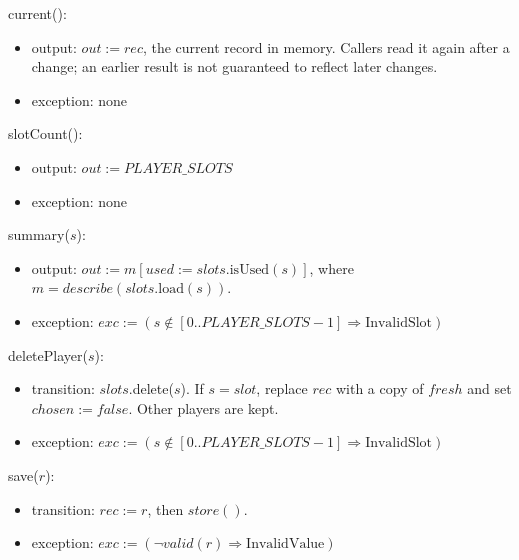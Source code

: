 \documentclass[10pt, titlepage]{article}
\newcommand{\T}[1]{\mathit{#1}}          %
\newcommand{\out}{\mathit{out}}
\newcommand{\exc}{\mathit{exc}}
\newcommand{\false}{\mathit{false}}
\begin{document}
\begin{samepage}
\noindent current():
\begin{itemize}
\item output: $\out := \T{rec}$, the current record in memory. Callers
  read it again after a change; an earlier result is not guaranteed to
  reflect later changes.
\item exception: none
\end{itemize}
\end{samepage}
\par\pagebreak[0]

\begin{samepage}
\noindent slotCount():
\begin{itemize}
\item output: $\out := \T{PLAYER\_SLOTS}$
\item exception: none
\end{itemize}
\end{samepage}
\par\pagebreak[0]

\begin{samepage}
\noindent summary($s$):
\begin{itemize}
\item output: $\out := m[\T{used} := \T{slots}.\text{isUsed}(s)]$, where
  $m = \T{describe}(\T{slots}.\text{load}(s))$.
\item exception: $\exc := (s \notin [0..\T{PLAYER\_SLOTS}-1]
  \Rightarrow \text{InvalidSlot})$
\end{itemize}
\end{samepage}
\par\pagebreak[0]

\begin{samepage}
\noindent deletePlayer($s$):
\begin{itemize}
\item transition: $\T{slots}$.delete($s$). If $s = \T{slot}$,
  replace $\T{rec}$ with a copy of $\T{fresh}$ and set
  $\T{chosen} := \false$. Other players are kept.
\item exception: $\exc := (s \notin [0..\T{PLAYER\_SLOTS}-1]
  \Rightarrow \text{InvalidSlot})$
\end{itemize}
\end{samepage}
\par\pagebreak[0]

\begin{samepage}
\noindent save($r$):
\begin{itemize}
\item transition: $\T{rec} := r$, then $\T{store}()$.
\item exception: $\exc := (\neg\T{valid}(r) \Rightarrow
  \text{InvalidValue})$
\end{itemize}
\end{samepage}
\par\pagebreak[0]
\end{document}
